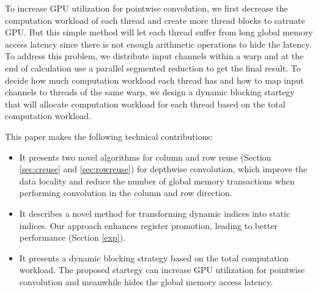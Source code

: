 To increase GPU utilization for pointwise convolution, we first decrease the computation workload of each thread and create more thread blocks to satruate GPU. 
But this simple method will let each thread suffer from long global memory access latency since there is not enough arithmetic operations to hide the latency.
To address this problem, we distribute input channels within a warp and at the end of calculation use a parallel segmented reduction to get the final result. 
To decide how much computation workload each thread has and how to map input channels to threads of the same warp, we design a dynamic blocking startegy that will allocate computation workload for each thread based on the total computation workload. 

This paper makes the following technical contributions:
\begin{itemize}
    \item It presents two novel algorithms for column and row reuse (Section \ref{sec:creuse} and \ref{sec:rowreuse}) for depthwise convolution, which improve the data locality and reduce the number of global memory transactions when performing convolution in the column and row direction.
    \item It describes a novel method for transforming dynamic indices into static indices. 
    Our approach enhances register promotion, leading to better performance (Section \ref{exp}).
    \item It presents a dynamic blocking strategy based on the total computation workload. The proposed startegy can increase GPU utilization for pointwise convolution and meanwhile hides the global memory access latency. 
\end{itemize}

